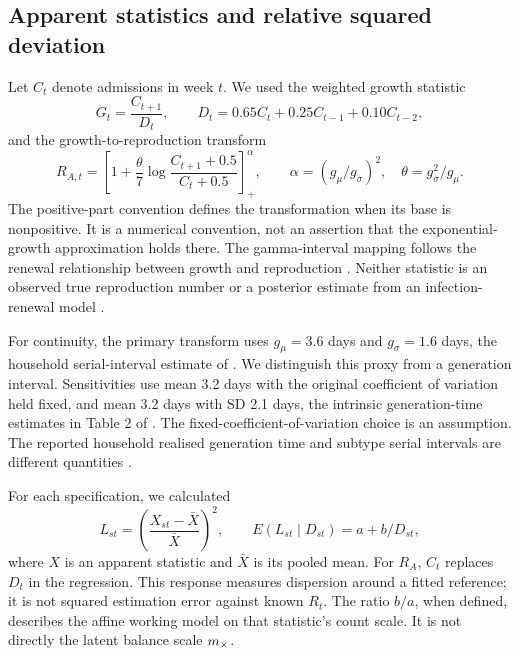 \subsection{Apparent statistics and relative squared deviation}
\label{sec:meth-stats}

Let $C_t$ denote admissions in week $t$. We used the weighted growth statistic
\begin{equation}
G_t=\frac{C_{t+1}}{D_t},\qquad D_t=0.65C_t+0.25C_{t-1}+0.10C_{t-2},
\label{eq:dt}
\end{equation}
and the growth-to-reproduction transform
\begin{equation}
R_{A,t}=\left[1+\frac{\theta}{7}\log\frac{C_{t+1}+0.5}{C_t+0.5}\right]_{+}^{\alpha},\qquad
\alpha=(g_\mu/g_\sigma)^2,\quad\theta=g_\sigma^2/g_\mu.
\label{eq:ra}
\end{equation}
The positive-part convention defines the transformation when its base is nonpositive. It is a numerical convention, not an assertion that the exponential-growth approximation holds there. The gamma-interval mapping follows the renewal relationship between growth and reproduction \citep{wallinga2007how}. Neither statistic is an observed true reproduction number or a posterior estimate from an infection-renewal model \citep{cori2013new,eales2024differences}.

For continuity, the primary transform uses $g_\mu=3.6$ days and $g_\sigma=1.6$ days, the household serial-interval estimate of \citet{cowling2009estimation}. We distinguish this proxy from a generation interval. Sensitivities use mean 3.2 days with the original coefficient of variation held fixed, and mean 3.2 days with SD 2.1 days, the intrinsic generation-time estimates in Table 2 of \citet{chan2025estimating}. The fixed-coefficient-of-variation choice is an assumption. The reported household realised generation time and subtype serial intervals are different quantities \citep{chan2025estimating,vink2014serial}.

For each specification, we calculated
\begin{equation}
L_{st}=\left(\frac{X_{st}-\bar X}{\bar X}\right)^2,
\qquad E(L_{st}\mid D_{st})=a+b/D_{st},
\label{eq:affine}
\end{equation}
where $X$ is an apparent statistic and $\bar X$ is its pooled mean. For $R_A$, $C_t$ replaces $D_t$ in the regression. This response measures dispersion around a fitted reference; it is not squared estimation error against known $R_t$. The ratio $b/a$, when defined, describes the affine working model on that statistic's count scale. It is not directly the latent balance scale $m_{\times}$.

